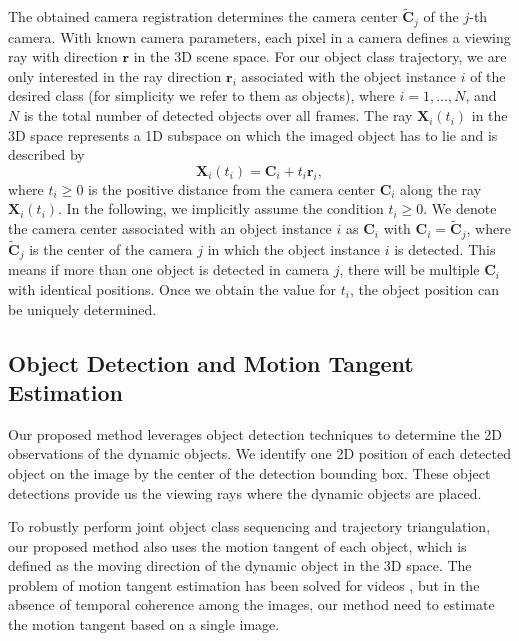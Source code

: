 The obtained camera registration determines the camera center $\mathbf{\tilde{C}}_j$ of the $j$-th camera. 
With known camera parameters, each pixel in a camera defines a viewing ray with direction $\mathbf{r}$ in the 3D scene space. For our object class trajectory, we are only interested in the ray direction $\mathbf r_i$ associated with the object instance $i$ of the desired class (for simplicity we refer to them as objects), where  $i =1, \dots, N$, and $N$ is the total number of detected objects over all frames. %
The ray $\mathbf{X}_i(t_i)$ in the 3D space represents a 1D subspace on which the imaged object has to lie and is described by
\begin{equation}
\label{eq:ray}
\mathbf{X}_i(t_i)=\mathbf{C}_i + t_i \mathbf{r}_i,
\end{equation}
where $t_i \geq 0$ is the positive distance from the camera center $\mathbf{C}_i$ along the ray $\mathbf{X}_i(t_i)$.
In the following, we implicitly assume the condition $t_i \geq 0$.
We denote the camera center associated with an object instance $i$ as $\mathbf{C}_i$  with $\mathbf{C}_i =\mathbf{\tilde{C}}_j$, where $\mathbf{\tilde{C}}_j$ is the center of the camera $j$ in which the object instance $i$ is detected. This means if more than one object is detected in camera $j$, there will be multiple $\mathbf{C}_i$ with identical positions. Once we obtain the value for $t_i$, the object position can be uniquely determined. 


\subsection{Object Detection and Motion Tangent Estimation}
\label{sec:detection}

Our proposed method leverages object detection techniques to determine the 2D observations of the dynamic objects. We identify one 2D position of each detected object  on the image by the center of the detection bounding box. These object detections provide us the viewing rays where the dynamic objects are placed. 

To robustly perform joint object class sequencing and trajectory triangulation, our proposed method also uses the motion tangent of each object, which is defined as the moving direction of the dynamic object in the 3D space. 
The problem of motion tangent estimation has been solved for videos \cite{zhao2003face}, but  in the absence of temporal coherence among the images, our method need to estimate the motion tangent based on a single image.

